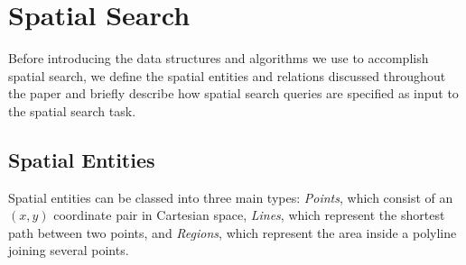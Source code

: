 \section{Spatial Search}
\label{section:background}
Before introducing the data structures and algorithms we use to accomplish spatial search, we define the spatial entities and relations discussed throughout the paper and briefly describe how spatial search queries are specified as input to the spatial search task.
\subsection{Spatial Entities}
\par{
    Spatial entities can be classed into three main types: \textit{Points}, which consist of an $(x,y)$ coordinate pair in Cartesian space, \textit{Lines}, which represent the shortest path between two points, and \textit{Regions}, which represent the area inside a polyline joining several points. %
    
    
}


